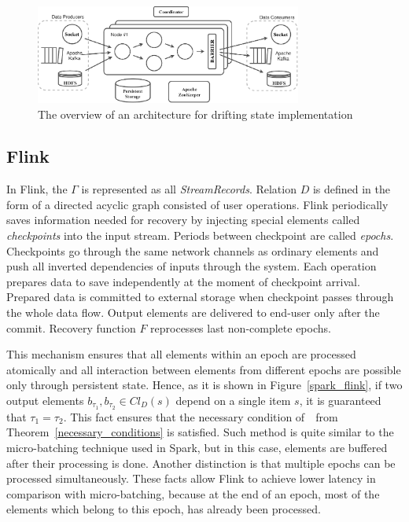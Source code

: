 \begin{figure}[tbp]
  \centering
  \includegraphics[width=0.78\textwidth]{pics/arch}
  \caption{The overview of an architecture for drifting state implementation}
  \label {arch}
\end{figure}
 

\subsection{Flink}

In Flink, the  $\Gamma$ is represented as all {\em StreamRecords}. Relation $D$ is defined in the form of a directed acyclic graph consisted of user operations. Flink periodically saves information needed for recovery by injecting special elements called {\em checkpoints} into the input stream. Periods between checkpoint are called {\em epochs}. Checkpoints go through the same network channels as ordinary elements and push all inverted dependencies of inputs through the system. Each operation prepares data to save independently at the moment of checkpoint arrival. Prepared data is committed to external storage when checkpoint passes through the whole data flow. Output elements are delivered to end-user only after the commit. Recovery function $F$ reprocesses last non-complete epochs.

This mechanism ensures that all elements within an epoch are processed atomically and all interaction between elements from different epochs are possible only through persistent state. Hence, as it is shown in Figure~\ref{spark_flink}, if two output elements $b_{\tau_1},b_{\tau_2} \in Cl_D(s)$ depend on a single item $s$, it is guaranteed that $\tau_1=\tau_2$. This fact ensures that the necessary condition of~\eo\ from Theorem~\ref{necessary_conditions} is satisfied. Such method is quite similar to the micro-batching technique used in Spark, but in this case, elements are buffered after their processing is done. Another distinction is that multiple epochs can be processed simultaneously. These facts allow Flink to achieve lower latency in comparison with micro-batching, because at the end of an epoch, most of the elements which belong to this epoch, has already been processed.

